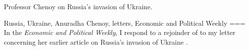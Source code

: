 Professor Chenoy on Russia’s invasion of Ukraine.

Russia, Ukraine, Anuradha Chenoy, letters, Economic and Political Weekly
===
In the \emph{Economic and Political Weekly}, I respond \parencite{loo2023a} to a rejoinder of \textcite{chenoy2023a} to my letter \parencite{loo2023} concerning her earlier article on Russia’s invasion of Ukraine \parencite{chenoy2023}.